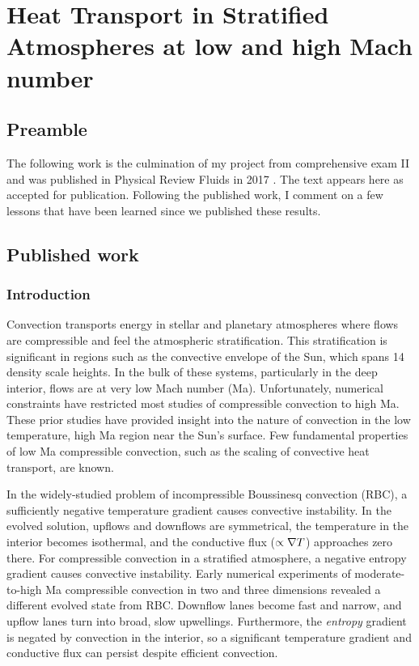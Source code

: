 \chapter{Heat Transport in Stratified Atmospheres at low and high Mach number}
\label{ch:ab17}

\section{Preamble}
The following work is the culmination of my project from comprehensive exam II and was published in Physical Review Fluids in 2017 \citep{anders&brown2017}.
The text appears here as accepted for publication.
Following the published work, I comment on a few lessons that have been learned since we published these results.

\section{Published work}

\subsection{Introduction}
\label{sec:intro}
Convection transports energy in stellar and planetary atmospheres where flows are compressible and feel the atmospheric stratification.  
This stratification is significant in regions such as the convective envelope of the Sun, which spans 14 density scale heights.
In the bulk of these systems, particularly in the deep interior, flows are at very low Mach number (Ma).  
Unfortunately, numerical constraints have restricted most studies of compressible convection to high Ma.
These prior studies \cite{graham1975, chan&all1982, hurlburt&all1984, cattaneo&all1990, brummell&all1996, brandenburg&all2005} have provided insight into the nature of convection in the low temperature, high Ma region near the Sun's surface. 
Few fundamental properties of low Ma compressible convection, such as the scaling of convective heat transport, are known.

In the widely-studied \RB problem of incompressible Boussinesq convection (RBC), a sufficiently negative temperature gradient causes convective instability.
In the evolved solution, upflows and downflows are symmetrical, the temperature in the interior becomes isothermal, and the conductive flux ($\propto \nabla T$) approaches zero there. 
For compressible convection in a stratified atmosphere, a negative entropy gradient causes convective instability.
Early numerical experiments of moderate-to-high Ma compressible convection in two \cite{graham1975, chan&all1982, hurlburt&all1984, cattaneo&all1990} and three \cite{cattaneo&all1991, brandenburg&all2005, brummell&all1996} dimensions revealed a different evolved state from RBC.
Downflow lanes become fast and narrow, and upflow lanes turn into broad, slow upwellings.
Furthermore, the \emph{entropy} gradient is negated by convection in the interior, so a significant temperature gradient and conductive flux can persist despite efficient convection.

